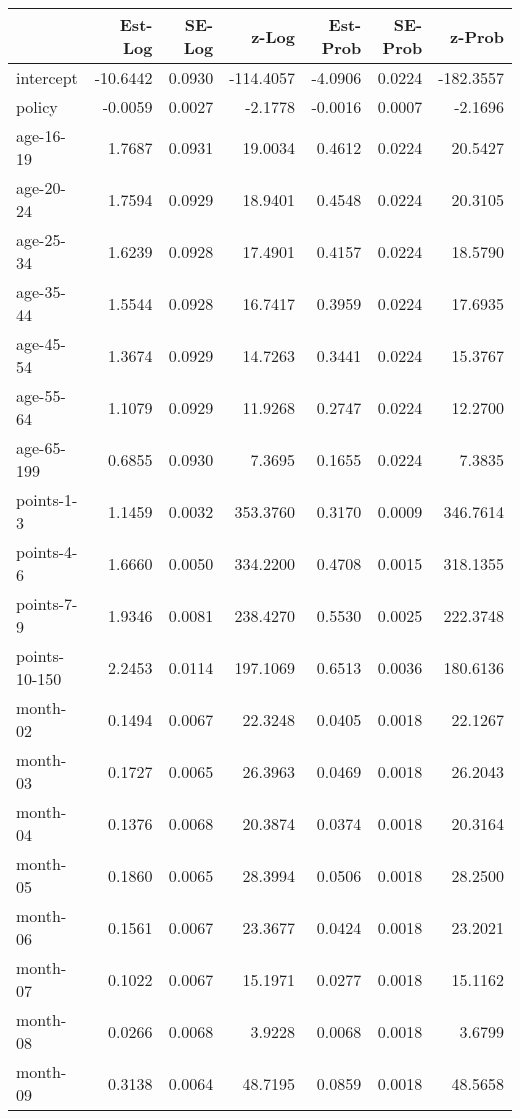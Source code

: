 \documentclass[10pt]{article}
\begin{document}
\begin{table}[ht]
\centering
\begin{tabular}{lrrrrrr}
  \hline
 & Est-Log & SE-Log & z-Log & Est-Prob & SE-Prob & z-Prob \\ 
  \hline
intercept & -10.6442 & 0.0930 & -114.4057 & -4.0906 & 0.0224 & -182.3557 \\ 
  policy & -0.0059 & 0.0027 & -2.1778 & -0.0016 & 0.0007 & -2.1696 \\ 
  age-16-19 & 1.7687 & 0.0931 & 19.0034 & 0.4612 & 0.0224 & 20.5427 \\ 
  age-20-24 & 1.7594 & 0.0929 & 18.9401 & 0.4548 & 0.0224 & 20.3105 \\ 
  age-25-34 & 1.6239 & 0.0928 & 17.4901 & 0.4157 & 0.0224 & 18.5790 \\ 
  age-35-44 & 1.5544 & 0.0928 & 16.7417 & 0.3959 & 0.0224 & 17.6935 \\ 
  age-45-54 & 1.3674 & 0.0929 & 14.7263 & 0.3441 & 0.0224 & 15.3767 \\ 
  age-55-64 & 1.1079 & 0.0929 & 11.9268 & 0.2747 & 0.0224 & 12.2700 \\ 
  age-65-199 & 0.6855 & 0.0930 & 7.3695 & 0.1655 & 0.0224 & 7.3835 \\ 
  points-1-3 & 1.1459 & 0.0032 & 353.3760 & 0.3170 & 0.0009 & 346.7614 \\ 
  points-4-6 & 1.6660 & 0.0050 & 334.2200 & 0.4708 & 0.0015 & 318.1355 \\ 
  points-7-9 & 1.9346 & 0.0081 & 238.4270 & 0.5530 & 0.0025 & 222.3748 \\ 
  points-10-150 & 2.2453 & 0.0114 & 197.1069 & 0.6513 & 0.0036 & 180.6136 \\ 
  month-02 & 0.1494 & 0.0067 & 22.3248 & 0.0405 & 0.0018 & 22.1267 \\ 
  month-03 & 0.1727 & 0.0065 & 26.3963 & 0.0469 & 0.0018 & 26.2043 \\ 
  month-04 & 0.1376 & 0.0068 & 20.3874 & 0.0374 & 0.0018 & 20.3164 \\ 
  month-05 & 0.1860 & 0.0065 & 28.3994 & 0.0506 & 0.0018 & 28.2500 \\ 
  month-06 & 0.1561 & 0.0067 & 23.3677 & 0.0424 & 0.0018 & 23.2021 \\ 
  month-07 & 0.1022 & 0.0067 & 15.1971 & 0.0277 & 0.0018 & 15.1162 \\ 
  month-08 & 0.0266 & 0.0068 & 3.9228 & 0.0068 & 0.0018 & 3.6799 \\ 
  month-09 & 0.3138 & 0.0064 & 48.7195 & 0.0859 & 0.0018 & 48.5658 \\ 

\end{tabular}
\end{table}
\end{document}
